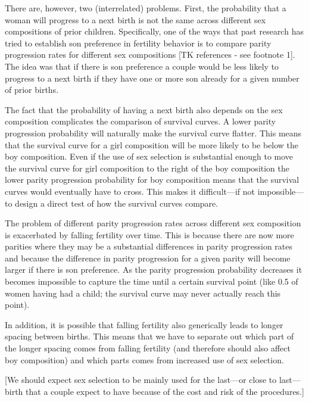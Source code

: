 \documentclass[12pt,letterpaper]{article}
\begin{document}
There are, however, two (interrelated) problems.
First, the probability that a woman will progress to a next birth  
is not the same across different sex compositions of prior children.
Specifically, one of the ways that past research has tried to establish
son preference in fertility behavior is to compare parity progression
rates for different sex compositions [TK references - see footnote 1].
The idea was that if there is son preference a couple would be less likely
to progress to a next birth if they have one or more son already for a
given number of prior births.

The fact that the probability of having a next birth also depends on the
sex composition complicates the comparison of survival curves. 
A lower parity progression probability will naturally make the survival
curve flatter.
This means that the survival curve for a girl composition will be more
likely to be below the boy composition.
Even if the use of sex selection is substantial enough to move the
survival curve for girl composition to the right of the boy
composition the lower parity progression probability for boy 
composition means that the survival curves would eventually have to
cross.
This makes it difficult---if not impossible---to design a direct test
of how the survival curves compare.

The problem of different parity progression rates across different
sex composition is exacerbated by falling fertility over time.
This is because there are now more parities where they may be a 
substantial differences in parity progression rates and because
the difference in parity progression for a given parity will 
become larger if there is son preference.
As the parity progression probability decreases it becomes impossible
to capture the time until a certain survival point (like 0.5 of women
having had a child; the survival curve may never actually reach this
point).

In addition, it is possible that falling fertility also generically 
leads to longer spacing between births.
This means that we have to separate out which part of the longer
spacing comes from falling fertility (and therefore should also
affect boy composition) and which parts comes from increased use
of sex selection.

[We should expect sex selection to be mainly used for the last---or close to
last---birth that a couple expect to have because of the cost and risk
of the procedures.]
\end{document}
